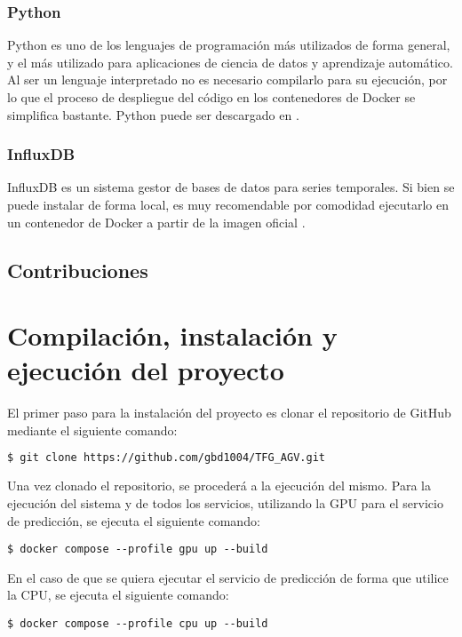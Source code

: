 \subsubsection{Python}

Python es uno de los lenguajes de programación más utilizados de forma general, y el más utilizado para aplicaciones 
de ciencia de datos y aprendizaje automático. Al ser un lenguaje interpretado no es necesario compilarlo para su ejecución, 
por lo que el proceso de despliegue del código en los contenedores de Docker se simplifica bastante.
Python puede ser descargado en \cite{python310}.

\subsubsection{InfluxDB}

InfluxDB es un sistema gestor de bases de datos para series temporales. Si bien se puede instalar de forma local,
es muy recomendable por comodidad ejecutarlo en un contenedor de Docker a partir de la imagen oficial \cite{influx:docker}.

\subsection{Contribuciones}

\section{Compilación, instalación y ejecución del proyecto}

El primer paso para la instalación del proyecto es clonar el repositorio de GitHub mediante el siguiente comando:
\begin{lstlisting}[language=bash]
$ git clone https://github.com/gbd1004/TFG_AGV.git
\end{lstlisting}

Una vez clonado el repositorio, se procederá a la ejecución del mismo. Para la ejecución del sistema y de 
todos los servicios, utilizando la GPU para el servicio de predicción, se ejecuta el siguiente comando:
\begin{lstlisting}
$ docker compose --profile gpu up --build
\end{lstlisting}
En el caso de que se quiera ejecutar el servicio de predicción de forma que utilice la CPU, se ejecuta el 
siguiente comando:
\begin{lstlisting}
$ docker compose --profile cpu up --build
\end{lstlisting}

